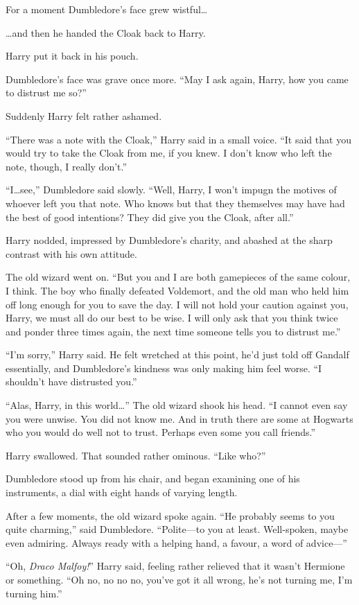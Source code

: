 For a moment Dumbledore’s face grew wistful…

…and then he handed the Cloak back to Harry.

Harry put it back in his pouch.

Dumbledore’s face was grave once more. “May I ask again, Harry, how you came to distrust me so?”

Suddenly Harry felt rather ashamed.

“There was a note with the Cloak,” Harry said in a small voice. “It said that you would try to take the Cloak from me, if you knew. I don’t know who left the note, though, I really don’t.”

“I…see,” Dumbledore said slowly. “Well, Harry, I won’t impugn the motives of whoever left you that note. Who knows but that they themselves may have had the best of good intentions? They did give you the Cloak, after all.”

Harry nodded, impressed by Dumbledore’s charity, and abashed at the sharp contrast with his own attitude.

The old wizard went on. “But you and I are both gamepieces of the same colour, I think. The boy who finally defeated Voldemort, and the old man who held him off long enough for you to save the day. I will not hold your caution against you, Harry, we must all do our best to be wise. I will only ask that you think twice and ponder three times again, the next time someone tells you to distrust me.”

“I’m sorry,” Harry said. He felt wretched at this point, he’d just told off Gandalf essentially, and Dumbledore’s kindness was only making him feel worse. “I shouldn’t have distrusted you.”

“Alas, Harry, in this world…” The old wizard shook his head. “I cannot even say you were unwise. You did not know me. And in truth there are some at Hogwarts who you would do well not to trust. Perhaps even some you call friends.”

Harry swallowed. That sounded rather ominous. “Like who?”

Dumbledore stood up from his chair, and began examining one of his instruments, a dial with eight hands of varying length.

After a few moments, the old wizard spoke again. “He probably seems to you quite charming,” said Dumbledore. “Polite—to you at least. Well-spoken, maybe even admiring. Always ready with a helping hand, a favour, a word of advice—”

“Oh, \emph{Draco Malfoy!}” Harry said, feeling rather relieved that it wasn’t Hermione or something. “Oh no, no no no, you’ve got it all wrong, he’s not turning me, I’m turning him.”

